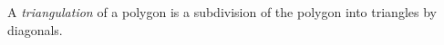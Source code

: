 

\setcounter{section}{4}
\setcounter{subsection}{4}
\setcounter{dfn}{5}

A \emph{triangulation} of a polygon is a subdivision of the polygon into triangles by diagonals.



